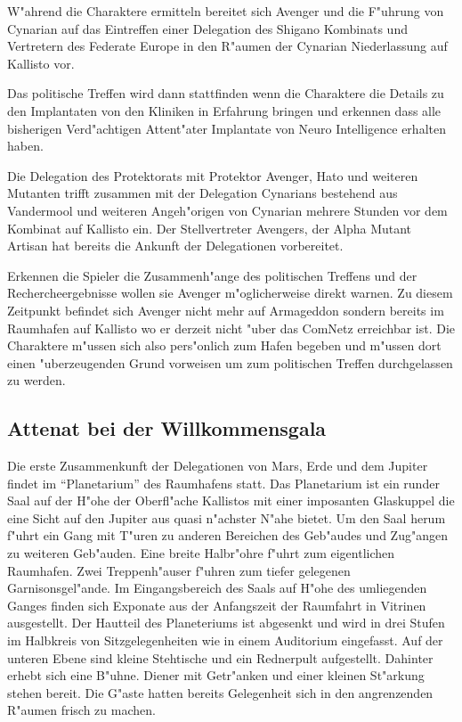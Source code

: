 W"ahrend die Charaktere ermitteln bereitet sich Avenger und die F"uhrung von Cynarian auf das Eintreffen einer Delegation des Shigano Kombinats und Vertretern des Federate Europe in den R"aumen der Cynarian Niederlassung auf Kallisto vor.

Das politische Treffen wird dann stattfinden wenn die Charaktere die Details zu den Implantaten von den Kliniken in
Erfahrung bringen und erkennen dass alle bisherigen Verd"achtigen Attent"ater Implantate von Neuro Intelligence
erhalten haben.

Die Delegation des Protektorats mit Protektor Avenger, Hato und weiteren Mutanten trifft zusammen mit der Delegation Cynarians bestehend aus Vandermool und weiteren Angeh"origen von Cynarian mehrere Stunden vor dem Kombinat auf Kallisto
ein. Der Stellvertreter Avengers, der Alpha Mutant Artisan hat bereits die Ankunft der Delegationen vorbereitet.

\begin{remarks}
Erkennen die Spieler die Zusammenh"ange des politischen Treffens und der Rechercheergebnisse wollen sie Avenger m"oglicherweise direkt warnen. Zu diesem Zeitpunkt befindet sich Avenger nicht mehr auf Armageddon sondern bereits im Raumhafen auf Kallisto wo er derzeit nicht "uber das ComNetz erreichbar ist. Die Charaktere m"ussen sich also pers"onlich zum Hafen begeben und m"ussen dort einen "uberzeugenden Grund vorweisen um zum politischen Treffen durchgelassen zu werden.
\end{remarks}

\subsection{Attenat bei der Willkommensgala}

Die erste Zusammenkunft der Delegationen von Mars, Erde und dem Jupiter findet im "`Planetarium"' des Raumhafens statt. Das Planetarium ist ein runder Saal auf der H"ohe der Oberfl"ache Kallistos mit einer imposanten Glaskuppel die eine Sicht auf den Jupiter aus quasi n"achster N"ahe bietet. Um den Saal herum f"uhrt ein Gang mit T"uren zu anderen Bereichen des Geb"audes und Zug"angen zu weiteren Geb"auden. Eine breite Halbr"ohre f"uhrt zum eigentlichen Raumhafen. Zwei Treppenh"auser f"uhren zum tiefer gelegenen Garnisonsgel"ande. Im Eingangsbereich des Saals auf H"ohe des umliegenden Ganges finden sich Exponate aus der Anfangszeit der Raumfahrt in Vitrinen ausgestellt. Der Hautteil des Planeteriums ist abgesenkt und wird in drei Stufen im Halbkreis von Sitzgelegenheiten wie in einem Auditorium eingefasst. Auf der unteren Ebene sind kleine Stehtische und ein Rednerpult aufgestellt. Dahinter erhebt sich eine B"uhne. Diener mit Getr"anken und einer kleinen St"arkung stehen bereit. Die G"aste hatten bereits Gelegenheit sich in den angrenzenden R"aumen frisch zu machen.

